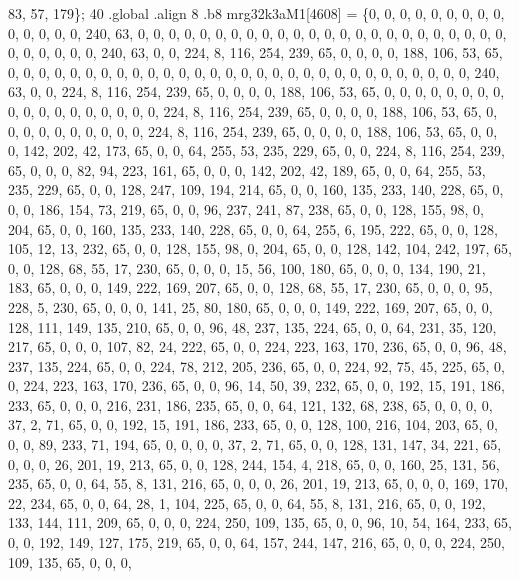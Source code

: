 \begin{DoxyCode}
       83, 57, 179\};
40 .global .align 8 .b8 mrg32k3aM1[4608] = \{0, 0, 0, 0, 0, 0, 0, 0, 0, 0, 0, 0, 0, 0, 240, 63, 0, 0, 0, 0, 0,
       0, 0, 0, 0, 0, 0, 0, 0, 0, 0, 0, 0, 0, 0, 0, 0, 0, 0, 0, 0, 0, 0, 0, 0, 0, 240, 63, 0, 0, 224, 8, 116, 254,
       239, 65, 0, 0, 0, 0, 188, 106, 53, 65, 0, 0, 0, 0, 0, 0, 0, 0, 0, 0, 0, 0, 0, 0, 0, 0, 0, 0, 0, 0, 0, 0, 0,
       0, 0, 0, 0, 0, 0, 0, 240, 63, 0, 0, 224, 8, 116, 254, 239, 65, 0, 0, 0, 0, 188, 106, 53, 65, 0, 0, 0, 0, 0,
       0, 0, 0, 0, 0, 0, 0, 0, 0, 0, 0, 0, 0, 224, 8, 116, 254, 239, 65, 0, 0, 0, 0, 188, 106, 53, 65, 0, 0, 0, 0,
       0, 0, 0, 0, 0, 0, 224, 8, 116, 254, 239, 65, 0, 0, 0, 0, 188, 106, 53, 65, 0, 0, 0, 142, 202, 42, 173, 65,
       0, 0, 64, 255, 53, 235, 229, 65, 0, 0, 224, 8, 116, 254, 239, 65, 0, 0, 0, 82, 94, 223, 161, 65, 0, 0, 0,
       142, 202, 42, 189, 65, 0, 0, 64, 255, 53, 235, 229, 65, 0, 0, 128, 247, 109, 194, 214, 65, 0, 0, 160, 135, 233,
       140, 228, 65, 0, 0, 0, 186, 154, 73, 219, 65, 0, 0, 96, 237, 241, 87, 238, 65, 0, 0, 128, 155, 98, 0, 204,
       65, 0, 0, 160, 135, 233, 140, 228, 65, 0, 0, 64, 255, 6, 195, 222, 65, 0, 0, 128, 105, 12, 13, 232, 65, 0,
       0, 128, 155, 98, 0, 204, 65, 0, 0, 128, 142, 104, 242, 197, 65, 0, 0, 128, 68, 55, 17, 230, 65, 0, 0, 0, 15,
       56, 100, 180, 65, 0, 0, 0, 134, 190, 21, 183, 65, 0, 0, 0, 149, 222, 169, 207, 65, 0, 0, 128, 68, 55, 17,
       230, 65, 0, 0, 0, 95, 228, 5, 230, 65, 0, 0, 0, 141, 25, 80, 180, 65, 0, 0, 0, 149, 222, 169, 207, 65, 0, 0,
       128, 111, 149, 135, 210, 65, 0, 0, 96, 48, 237, 135, 224, 65, 0, 0, 64, 231, 35, 120, 217, 65, 0, 0, 0, 107,
       82, 24, 222, 65, 0, 0, 224, 223, 163, 170, 236, 65, 0, 0, 96, 48, 237, 135, 224, 65, 0, 0, 224, 78, 212,
       205, 236, 65, 0, 0, 224, 92, 75, 45, 225, 65, 0, 0, 224, 223, 163, 170, 236, 65, 0, 0, 96, 14, 50, 39, 232, 65,
       0, 0, 192, 15, 191, 186, 233, 65, 0, 0, 0, 216, 231, 186, 235, 65, 0, 0, 64, 121, 132, 68, 238, 65, 0, 0,
       0, 0, 37, 2, 71, 65, 0, 0, 192, 15, 191, 186, 233, 65, 0, 0, 128, 100, 216, 104, 203, 65, 0, 0, 0, 89, 233,
       71, 194, 65, 0, 0, 0, 0, 37, 2, 71, 65, 0, 0, 128, 131, 147, 34, 221, 65, 0, 0, 0, 26, 201, 19, 213, 65, 0,
       0, 128, 244, 154, 4, 218, 65, 0, 0, 160, 25, 131, 56, 235, 65, 0, 0, 64, 55, 8, 131, 216, 65, 0, 0, 0, 26,
       201, 19, 213, 65, 0, 0, 0, 169, 170, 22, 234, 65, 0, 0, 64, 28, 1, 104, 225, 65, 0, 0, 64, 55, 8, 131, 216,
       65, 0, 0, 192, 133, 144, 111, 209, 65, 0, 0, 0, 224, 250, 109, 135, 65, 0, 0, 96, 10, 54, 164, 233, 65, 0, 0,
       192, 149, 127, 175, 219, 65, 0, 0, 64, 157, 244, 147, 216, 65, 0, 0, 0, 224, 250, 109, 135, 65, 0, 0, 0,

\end{DoxyCode}
